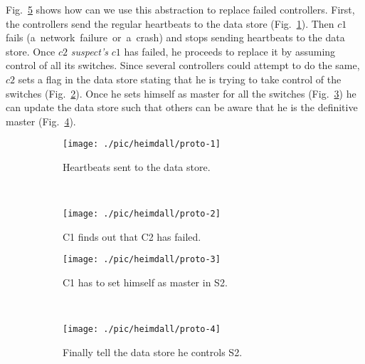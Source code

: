Fig.~\ref{fig:design:fault-tolerance} shows how can we use this abstraction to replace failed controllers. 
First, the controllers send the regular heartbeats to the data store (Fig.~\ref{fig:proto-heartbeats}). 
Then $c1$ fails \hbox{(a network failure or a crash)}  and  stops sending heartbeats to the data store.
Once  $c2$ \emph{suspect's} $c1$ has failed, he proceeds to replace it by assuming control of all its switches.  
Since several controllers could attempt to do the same, $c2$ sets a flag in the data store stating that he is trying to take control of the switches (Fig.~\ref{fig:proto-c2-fails}). 
Once he sets himself as master for all the switches (Fig.~\ref{fig:proto-c1-as-master}) he can update the data store such that others can be aware that he is the definitive master (Fig.~\ref{fig:proto-c1-finishes}). 

\begin{figure}

  \centering
  \begin{subfigure}[b]{0.5\textwidth}
                \centering
                \texttt{[image: ./pic/heimdall/proto-1]}
                \caption{Heartbeats sent to the data store. }
                \label{fig:proto-heartbeats}
        \end{subfigure}%
        ~
        \begin{subfigure}[b]{0.5\textwidth}
                \centering
                \texttt{[image: ./pic/heimdall/proto-2]}
                \caption{C1 finds out that C2 has failed.}
                \label{fig:proto-c2-fails}
        \end{subfigure}

  \begin{subfigure}[b]{0.5\textwidth}
                \centering
                \texttt{[image: ./pic/heimdall/proto-3]}
                \caption{C1 has to set himself as master in S2.}
                \label{fig:proto-c1-as-master}
        \end{subfigure}%
        ~
        \begin{subfigure}[b]{0.5\textwidth}
                \centering
                \texttt{[image: ./pic/heimdall/proto-4]}
                \caption{Finally tell the data store he controls S2.}
                \label{fig:proto-c1-finishes}
        \end{subfigure}
\caption[Fault Tolerance in the Control Plane.]{}
\label{fig:design:fault-tolerance}
\end{figure}


